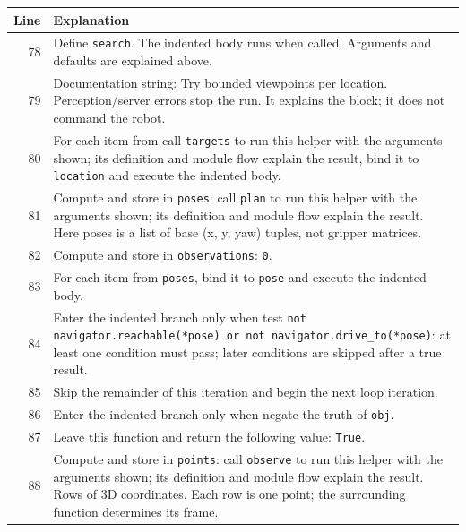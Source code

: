 \documentclass[11pt,a4paper]{book}
\begin{document}
\begin{longtable}{r p{}}

\textbf{Line} & \textbf{Explanation} \\ \hline \endhead

78 & Define \texttt{search}. The indented body runs when called. Arguments and defaults are explained above. \\

79 & Documentation string: Try bounded viewpoints per location. Perception/server errors stop the run. It explains the block; it does not command the robot. \\

80 & For each item from call \texttt{targets} to run this helper with the arguments shown; its definition and module flow explain the result, bind it to \texttt{location} and execute the indented body. \\

81 & Compute and store in \texttt{poses}: call \texttt{plan} to run this helper with the arguments shown; its definition and module flow explain the result. Here poses is a list of base (x, y, yaw) tuples, not gripper matrices. \\

82 & Compute and store in \texttt{observations}: \texttt{0}.  \\

83 & For each item from \texttt{poses}, bind it to \texttt{pose} and execute the indented body. \\

84 & Enter the indented branch only when test \texttt{not navigator.reachable(*pose) or not navigator.drive\_to(*pose)}: at least one condition must pass; later conditions are skipped after a true result. \\

85 & Skip the remainder of this iteration and begin the next loop iteration. \\

86 & Enter the indented branch only when negate the truth of \texttt{obj}. \\

87 & Leave this function and return the following value: \texttt{True}. \\

88 & Compute and store in \texttt{points}: call \texttt{observe} to run this helper with the arguments shown; its definition and module flow explain the result. Rows of 3D coordinates. Each row is one point; the surrounding function determines its frame. \\


\end{longtable}
\end{document}
